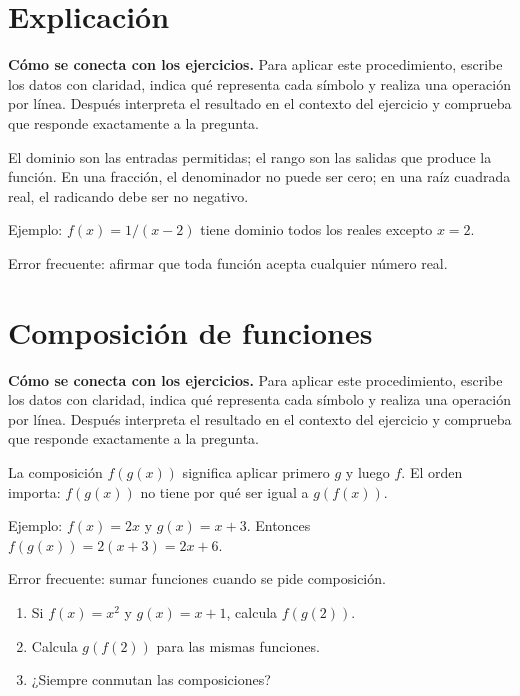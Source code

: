 \documentclass[10pt,oneside,openany]{book}
\begin{document}
\section{Explicación}

\textbf{Cómo se conecta con los ejercicios.} Para aplicar este procedimiento, escribe los datos con claridad, indica qué representa cada símbolo y realiza una operación por línea. Después interpreta el resultado en el contexto del ejercicio y comprueba que responde exactamente a la pregunta.

El dominio son las entradas permitidas; el rango son las salidas que produce la función. En una fracción, el denominador no puede ser cero; en una raíz cuadrada real, el radicando debe ser no negativo.



\begin{ejemplo}
Ejemplo: $f(x)=1/(x-2)$ tiene dominio todos los reales excepto $x=2$.
\end{ejemplo}

\begin{ojo}
Error frecuente: afirmar que toda función acepta cualquier número real.
\end{ojo}



\section{Composición de funciones}

\textbf{Cómo se conecta con los ejercicios.} Para aplicar este procedimiento, escribe los datos con claridad, indica qué representa cada símbolo y realiza una operación por línea. Después interpreta el resultado en el contexto del ejercicio y comprueba que responde exactamente a la pregunta.

La composición $f(g(x))$ significa aplicar primero $g$ y luego $f$. El orden importa: $f(g(x))$ no tiene por qué ser igual a $g(f(x))$.

\begin{ejemplo}
Ejemplo: $f(x)=2x$ y $g(x)=x+3$. Entonces $f(g(x))=2(x+3)=2x+6$.
\end{ejemplo}

\begin{ojo}
Error frecuente: sumar funciones cuando se pide composición.
\end{ojo}

\begin{practica}

\begin{enumerate}

\item Si $f(x)=x^2$ y $g(x)=x+1$, calcula $f(g(2))$.

\item Calcula $g(f(2))$ para las mismas funciones.

\item ¿Siempre conmutan las composiciones?

\end{enumerate}

\end{practica}
\end{document}
